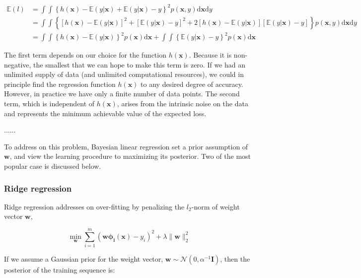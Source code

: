 \documentclass{article}
\begin{document}
	\begin{equation}
	\begin{split}
	\mathbb{E}(l) &= \int \int \left\{ h(\mathbf{x}) - \mathbb{E} (y|\mathbf{x}) + \mathbb{E} (y|\mathbf{x}) - y \right\}^2 p(\mathbf{x}, y) \text{d} \mathbf{x} \text{d}y \\
	&= \int \int \left\{ \left[ h(\mathbf{x}) - \mathbb{E} (y|\mathbf{x}) \right]^2 + \left[\mathbb{E} (y|\mathbf{x}) - y \right]^2 + 2 \left[ h(\mathbf{x}) - \mathbb{E} (y|\mathbf{x}) \right] \left[\mathbb{E} (y|\mathbf{x}) - y \right]  \right\} p(\mathbf{x}, y) \text{d} \mathbf{x} \text{d}y \\
	&= \int \int \left\{ h(\mathbf{x}) - \mathbb{E} (y|\mathbf{x}) \right\}^2 p(\mathbf{x}) \text{d} \mathbf{x} + \int \int \left\{\mathbb{E} (y|\mathbf{x}) - y \right\}^2 p(\mathbf{x}) \text{d} \mathbf{x}
	\end{split}
	\end{equation}
	
	The first term depends on our choice for the function $h(\mathbf{x})$. Because it is non-negative, the smallest that we can hope to make this term is zero. If we had an unlimited supply of data (and unlimited computational resources), we could in principle find the regression function $h(\mathbf{x})$ to any desired degree of accuracy. However, in practice we have only a finite number of data points. The second term, which is independent of $h(\mathbf{x})$, arises from the intrinsic
noise on the data and represents the minimum achievable value of the expected loss.

	......
	
	To address on this problem, Bayesian linear regression set a prior assumption of $\mathbf{w}$, and view the learning procedure to maximizing its posterior. Two of the most popular case is discussed below. 

\subsubsection{Ridge regression}

	Ridge regression addresses on over-fitting by penalizing the $l_2$-norm of weight vector $\mathbf{w}$,
	
	\begin{equation*}
	\min_\mathbf{w} \sum_{i=1}^m (\mathbf{w\phi_i(x)} - y_i)^2 + \lambda\|\mathbf{w}\|^2_2
	\end{equation*}

	If we assume a Gaussian prior for the weight vector, $\mathbf{w}\sim\mathcal{N}(0,\alpha^{-1}\mathbf{I})$, then the posterior of the training sequence is:
	
\end{document}
